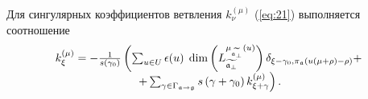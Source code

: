 \begin{theorem}
  \label{recurrent-relation-theorem}
  Для сингулярных коэффициентов ветвления $k^{(\mu)}_{\nu}$ (\ref{eq:21}) выполняется соотношение
  \begin{equation}
    \label{recurrent-relation}
    \begin{array}{c}
      k_{\xi }^{\left( \mu \right) }=-\frac{1}{s\left( \gamma _{0}\right) }\left(
        \sum_{u\in U} \epsilon(u)\;
        \dim \left( L_{\widetilde{\mathfrak{a}_{\perp }}}^{\mu
        _{\widetilde{\mathfrak{a}_{\perp }}}\left( u\right) }\right)
        \delta_{\xi-\gamma_0,\pi_{\mathfrak{a}}(u(\mu+\rho)-\rho)}+ \right.\\
      \left.
        +\sum_{\gamma \in
          \Gamma _{\mathfrak{a} \rightarrow \mathfrak{g}}}s\left( \gamma +\gamma _{0}\right) k_{\xi
          +\gamma }^{\left( \mu \right) }\right).
    \end{array}
  \end{equation}
\end{theorem}
